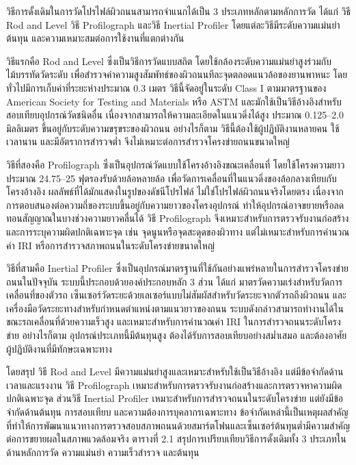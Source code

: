 วิธีการดั้งเดิมในการวัดโปรไฟล์ผิวถนนสามารถจำแนกได้เป็น 3 ประเภทหลักตามหลักการวัด ได้แก่ วิธี Rod and Level วิธี Profilograph และวิธี Inertial Profiler โดยแต่ละวิธีมีระดับความแม่นยำ ต้นทุน และความเหมาะสมต่อการใช้งานที่แตกต่างกัน

วิธีแรกคือ Rod and Level ซึ่งเป็นวิธีการวัดแบบสถิต โดยใช้กล้องระดับความแม่นยำสูงร่วมกับไม้บรรทัดวัดระดับ เพื่อสำรวจค่าความสูงสัมพัทธ์ของผิวถนนทีละจุดตลอดแนวล้อของยานพาหนะ โดยทั่วไปมีการเก็บค่าที่ระยะห่างประมาณ 0.3 เมตร วิธีนี้จัดอยู่ในระดับ Class I ตามมาตรฐานของ American Society for Testing and Materials หรือ ASTM และมักใช้เป็นวิธีอ้างอิงสำหรับสอบเทียบอุปกรณ์วัดชนิดอื่น เนื่องจากสามารถให้ความละเอียดในแนวดิ่งได้สูง ประมาณ 0.125–2.0 มิลลิเมตร ขึ้นอยู่กับระดับความขรุขระของผิวถนน \parencite{fhwa2016} อย่างไรก็ตาม วิธีนี้ต้องใช้ผู้ปฏิบัติงานหลายคน ใช้เวลานาน และมีอัตราการสำรวจต่ำ จึงไม่เหมาะต่อการสำรวจโครงข่ายถนนขนาดใหญ่

วิธีที่สองคือ Profilograph ซึ่งเป็นอุปกรณ์วัดแบบใช้โครงอ้างอิงขณะเคลื่อนที่ โดยใช้โครงความยาวประมาณ 24.75–25 ฟุตรองรับด้วยล้อหลายล้อ เพื่อวัดการเคลื่อนที่ในแนวดิ่งของล้อกลางเทียบกับโครงอ้างอิง ผลลัพธ์ที่ได้มักแสดงในรูปของดัชนีโปรไฟล์ ไม่ใช่โปรไฟล์ผิวถนนจริงโดยตรง เนื่องจากการตอบสนองต่อความถี่ของระบบขึ้นอยู่กับความยาวของโครงอุปกรณ์ ทำให้อุปกรณ์อาจขยายหรือลดทอนสัญญาณในบางช่วงความยาวคลื่นได้ วิธี Profilograph จึงเหมาะสำหรับการตรวจรับงานก่อสร้างและการระบุความผิดปกติเฉพาะจุด เช่น จุดนูนหรือจุดสะดุดของผิวทาง แต่ไม่เหมาะสำหรับการคำนวณค่า IRI หรือการสำรวจสภาพถนนในระดับโครงข่ายขนาดใหญ่ \parencite{fhwa2016}

วิธีที่สามคือ Inertial Profiler ซึ่งเป็นอุปกรณ์มาตรฐานที่ใช้กันอย่างแพร่หลายในการสำรวจโครงข่ายถนนในปัจจุบัน ระบบนี้ประกอบด้วยองค์ประกอบหลัก 3 ส่วน ได้แก่ มาตรวัดความเร่งสำหรับวัดการเคลื่อนที่ของตัวรถ เซ็นเซอร์วัดระยะด้วยเลเซอร์แบบไม่สัมผัสสำหรับวัดระยะจากตัวรถถึงผิวถนน และเครื่องมือวัดระยะทางสำหรับกำหนดตำแหน่งตามแนวยาวของถนน ระบบดังกล่าวสามารถทำงานได้ในขณะรถเคลื่อนที่ด้วยความเร็วสูง และเหมาะสำหรับการคำนวณค่า IRI ในการสำรวจถนนระดับโครงข่าย อย่างไรก็ตาม อุปกรณ์ประเภทนี้มีต้นทุนสูง ต้องได้รับการสอบเทียบอย่างสม่ำเสมอ และต้องอาศัยผู้ปฏิบัติงานที่มีทักษะเฉพาะทาง

โดยสรุป วิธี Rod and Level มีความแม่นยำสูงและเหมาะสำหรับใช้เป็นวิธีอ้างอิง แต่มีข้อจำกัดด้านเวลาและแรงงาน วิธี Profilograph เหมาะสำหรับการตรวจรับงานก่อสร้างและการตรวจหาความผิดปกติเฉพาะจุด ส่วนวิธี Inertial Profiler เหมาะสำหรับการสำรวจถนนในระดับโครงข่าย แต่ยังมีข้อจำกัดด้านต้นทุน การสอบเทียบ และความต้องการบุคลากรเฉพาะทาง ข้อจำกัดเหล่านี้เป็นเหตุผลสำคัญที่ทำให้การพัฒนาแนวทางการตรวจสอบสภาพถนนด้วยสมาร์ตโฟนและเซ็นเซอร์ต้นทุนต่ำมีความสำคัญต่อการขยายผลในสภาพแวดล้อมจริง ตารางที่ 2.1 สรุปการเปรียบเทียบวิธีการดั้งเดิมทั้ง 3 ประเภทในด้านหลักการวัด ความแม่นยำ ความเร็วสำรวจ และต้นทุน

